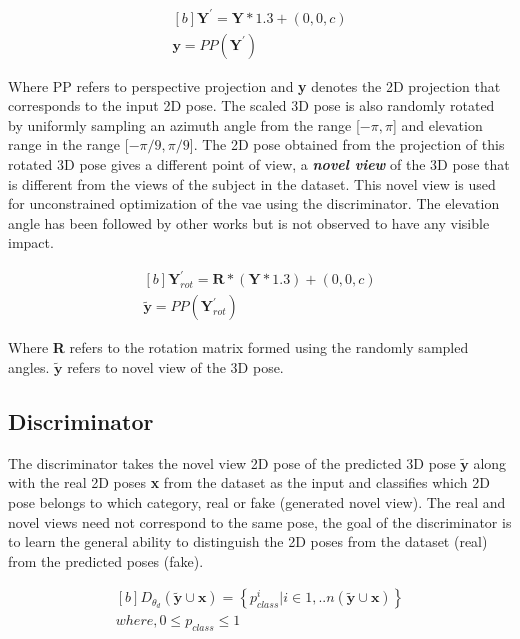 \begin{equation} \label{eqn:proj_direct}
    \begin{gathered}[b]
        \textbf{Y}^\prime = \textbf{Y}*1.3 + (0,0,c) \\
        \textbf{y} = PP(\textbf{Y}^\prime)
    \end{gathered}
\end{equation}

Where PP refers to perspective projection and \textbf{y} denotes the 2D projection that corresponds to the input 2D pose. The scaled 3D pose is also randomly rotated by uniformly sampling an azimuth angle from the range [$-\pi, \pi$] and elevation range in the range [$-\pi/9, \pi/9$]. The 2D pose obtained from the projection of this rotated 3D pose gives a different point of view, a \textbf{\textit{novel view}} of the 3D pose that is different from the views of the subject in the dataset. This novel view is used for unconstrained optimization of the \ac{vae} using the discriminator. The elevation angle has been followed by other works but is not observed to have any visible impact.

\begin{equation} \label{eqn:proj_rotated}
    \begin{gathered}[b]
        \textbf{Y}^\prime_{rot} = \textbf{R} * (\textbf{Y}*1.3) + (0,0,c) \\
        \tilde{\textbf{y}} = PP(\textbf{Y}^\prime_{rot})
    \end{gathered}
\end{equation}

Where \textbf{R} refers to the rotation matrix formed using the randomly sampled angles. $\tilde{\textbf{y}}$ refers to novel view of the 3D pose.

\subsection{Discriminator}
The discriminator takes the novel view 2D pose of the predicted 3D pose $\tilde{\textbf{y}}$ along with the real 2D poses \textbf{x} from the dataset as the input and classifies which 2D pose belongs to which category, real or fake (generated novel view). The real and novel views need not correspond to the same pose, the goal of the discriminator is to learn the general ability to distinguish the 2D poses from the dataset (real) from the predicted poses (fake).

\begin{equation} \label{eqn:discriminator_output}
    \begin{gathered}[b]
        D_{\theta_d}(\tilde{\textbf{y}} \cup \textbf{x}) = \left\lbrace p_{class}^i | i \in {1, .. n(\tilde{\textbf{y}} \cup \textbf{x})}\right\rbrace \\
        where, 0\leq p_{class} \leq 1
    \end{gathered}
\end{equation}

